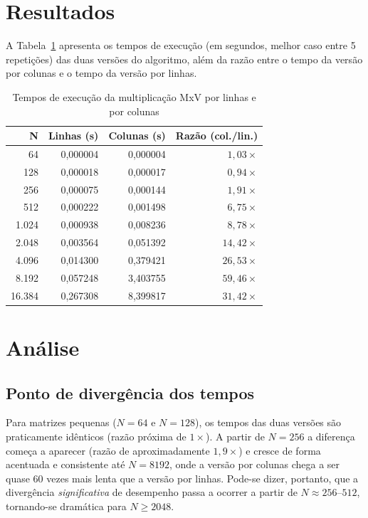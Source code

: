 \documentclass[a4paper,12pt]{article}
\begin{document}


\section{Resultados}

A Tabela~\ref{tab:resultados} apresenta os tempos de execução (em segundos,
melhor caso entre 5 repetições) das duas versões do algoritmo, além da razão
entre o tempo da versão por colunas e o tempo da versão por linhas.

\begin{table}[h]
\centering
\caption{Tempos de execução da multiplicação MxV por linhas e por colunas}
\label{tab:resultados}
\begin{tabular}{rrrr}
\toprule
N & Linhas (s) & Colunas (s) & Razão (col./lin.) \\
\midrule
64      & 0,000004 & 0,000004 & $1{,}03\times$  \\
128     & 0,000018 & 0,000017 & $0{,}94\times$  \\
256     & 0,000075 & 0,000144 & $1{,}91\times$  \\
512     & 0,000222 & 0,001498 & $6{,}75\times$  \\
1.024   & 0,000938 & 0,008236 & $8{,}78\times$  \\
2.048   & 0,003564 & 0,051392 & $14{,}42\times$ \\
4.096   & 0,014300 & 0,379421 & $26{,}53\times$ \\
8.192   & 0,057248 & 3,403755 & $59{,}46\times$ \\
16.384  & 0,267308 & 8,399817 & $31{,}42\times$ \\
\bottomrule
\end{tabular}
\end{table}

\section{Análise}

\subsection{Ponto de divergência dos tempos}

Para matrizes pequenas ($N = 64$ e $N = 128$), os tempos das duas versões são
praticamente idênticos (razão próxima de $1\times$). A partir de $N = 256$ a
diferença começa a aparecer (razão de aproximadamente $1{,}9\times$) e cresce de
forma acentuada e consistente até $N = 8192$, onde a versão por colunas chega a
ser quase 60 vezes mais lenta que a versão por linhas. Pode-se dizer, portanto,
que a divergência \emph{significativa} de desempenho passa a ocorrer a partir de
$N \approx 256$--$512$, tornando-se dramática para $N \geq 2048$.
\end{document}
